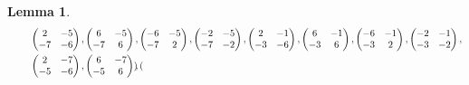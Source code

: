 \documentclass[12pt]{article}
\theoremstyle{definition}
\newtheorem{lemma}[theorem]{Lemma}
\numberwithin{equation}{section}
\numberwithin{theorem}{section}
\begin{document}
\begin{lemma}
{\begin{align*}
&\hspace{8mm}
\begin{pmatrix}
2 & -5 \\
-7 & -6
\end{pmatrix}, 
\begin{pmatrix}
6 & -5 \\
-7 & 6
\end{pmatrix}, 
\begin{pmatrix}
-6 & -5 \\
-7 & 2
\end{pmatrix}, 
\begin{pmatrix}
-2 & -5 \\
-7 & -2
\end{pmatrix}, 
\begin{pmatrix}
2 & -1 \\
-3 & -6
\end{pmatrix}, 
\begin{pmatrix}
6 & -1 \\
-3 & 6
\end{pmatrix}, 
\begin{pmatrix}
-6 & -1 \\
-3 & 2
\end{pmatrix}, 
\begin{pmatrix}
-2 & -1 \\
-3 & -2
\end{pmatrix},  \\
&\hspace{8mm}
\begin{pmatrix}
2 & -7 \\
-5 & -6
\end{pmatrix}, 
\begin{pmatrix}
6 & -7 \\
-5 & 6
\end{pmatrix}, 
\begin{pmatrix}

\end{pmatrix}
\end{align*}}
\end{lemma}
\end{document}
